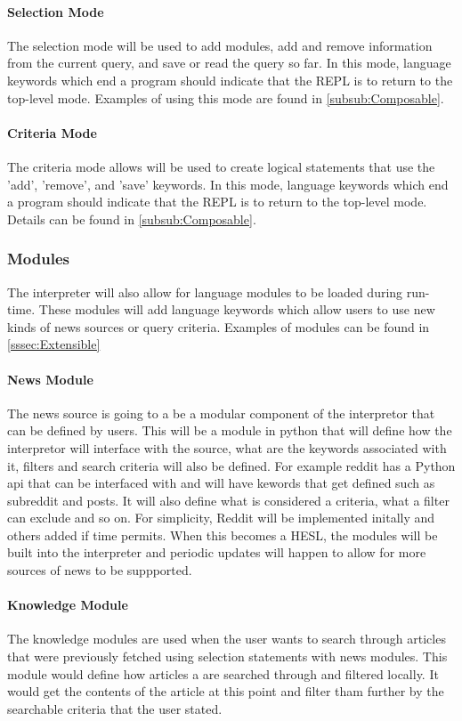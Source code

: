 \paragraph{Selection Mode}

The selection mode will be used to add modules, add and remove information from the current query, and save or read the query so far. In this mode, language keywords which end a program should indicate that the REPL is to return to the top-level mode. Examples of using this mode are found in \autoref{subsub:Composable}. 

\paragraph{Criteria Mode}

The criteria mode allows will be used to create logical statements that use the 'add', 'remove', and 'save' keywords. In this mode, language keywords which end a program should indicate that the REPL is to return to the top-level mode. Details can be found in \autoref{subsub:Composable}.


\subsubsection{Modules}

The interpreter will also allow for language modules to be loaded during run-time. These modules will add language keywords which allow users to use new kinds of news sources or query criteria. Examples of modules can be found in \autoref{sssec:Extensible}

\paragraph{News Module }

The news source is going to a be a modular component of the interpretor that can be defined by users. This will be a module in python that will define how the interpretor will interface with the source, what are the keywords associated with it, filters and search criteria will also be defined. For example reddit has a Python api that can be interfaced with and will have kewords that get defined such as subreddit and posts. It will also define what is considered a criteria, what a filter can exclude and so on. For simplicity, Reddit will be implemented initally and others added if time permits. When this becomes a HESL, the modules will be built into the interpreter and periodic updates will happen to allow for more sources of news to be suppported.\\


\paragraph{Knowledge Module}
The knowledge modules are used when the user wants to search through articles that were previously fetched using selection statements with news modules. This module would define how articles a are searched through and filtered locally. It would get the contents of the article at this point and filter tham further by the searchable criteria that the user stated.
